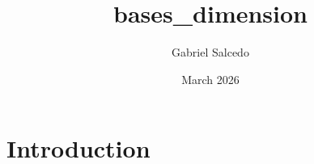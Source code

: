 \documentclass{article}
\title{bases_dimension}
\author{Gabriel Salcedo}
\date{March 2026}
\begin{document}
\maketitle

\section{Introduction}
\end{document}
